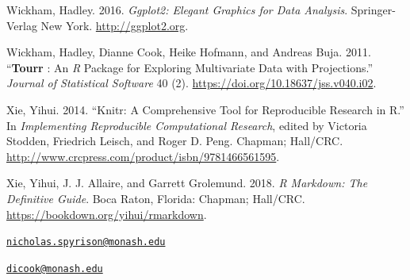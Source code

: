 \leavevmode\hypertarget{ref-wickham_ggplot2:_2016}{}%
Wickham, Hadley. 2016. \emph{Ggplot2: Elegant Graphics for Data
Analysis}. Springer-Verlag New York. \url{http://ggplot2.org}.

\leavevmode\hypertarget{ref-wickham_tourr_2011}{}%
Wickham, Hadley, Dianne Cook, Heike Hofmann, and Andreas Buja. 2011.
``\textbf{Tourr} : An \emph{R} Package for Exploring Multivariate Data
with Projections.'' \emph{Journal of Statistical Software} 40 (2).
\url{https://doi.org/10.18637/jss.v040.i02}.

\leavevmode\hypertarget{ref-stodden_knitr:_2014}{}%
Xie, Yihui. 2014. ``Knitr: A Comprehensive Tool for Reproducible
Research in R.'' In \emph{Implementing Reproducible Computational
Research}, edited by Victoria Stodden, Friedrich Leisch, and Roger D.
Peng. Chapman; Hall/CRC.
\url{http://www.crcpress.com/product/isbn/9781466561595}.

\leavevmode\hypertarget{ref-xie_r_2018}{}%
Xie, Yihui, J. J. Allaire, and Garrett Grolemund. 2018. \emph{R
Markdown: The Definitive Guide}. Boca Raton, Florida: Chapman; Hall/CRC.
\url{https://bookdown.org/yihui/rmarkdown}.



\address{%
Nicholas Spyrison\\
Monash University\\
Faculty of Information Technology\\
}
\href{mailto:nicholas.spyrison@monash.edu}{\nolinkurl{nicholas.spyrison@monash.edu}}

\address{%
Dianne Cook\\
Monash University\\
Department of Econometrics and Business Statistics\\
}
\href{mailto:dicook@monash.edu}{\nolinkurl{dicook@monash.edu}}

